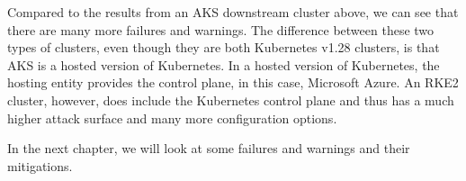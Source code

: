 Compared to the results from an AKS downstream cluster above, we can see that there are many more failures and warnings. The difference between these two types of clusters, even though they are both Kubernetes v1.28 clusters, is that AKS is a hosted version of Kubernetes. In a hosted version of Kubernetes, the hosting entity provides the control plane, in this case, Microsoft Azure. An RKE2 cluster, however, does include the Kubernetes control plane and thus has a much higher attack surface and many more configuration options.

In the next chapter, we will look at some failures and warnings and their mitigations.

